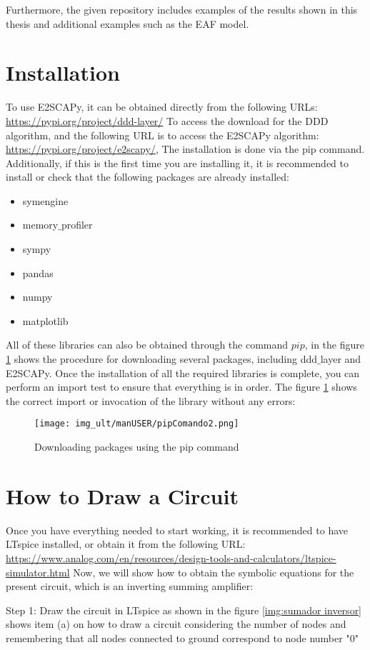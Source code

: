 \par
Furthermore, the given repository includes examples of the results shown in this thesis and additional examples such as the EAF model.
\section{Installation}
 To use E2SCAPy, it can be obtained directly from the following URLs: \url{https://pypi.org/project/ddd-layer/} To access the download for the DDD algorithm, and the following URL is to access the E2SCAPy algorithm: \url{https://pypi.org/project/e2scapy/}, The installation is done via the pip command. Additionally, if this is the first time you are installing it, it is recommended to install or check that the following packages are already installed:
\begin{itemize}
	\item symengine
	\item memory$\_$profiler
	\item sympy
	\item pandas
	\item numpy
	\item matplotlib
\end{itemize}

All of these libraries can also be obtained through the command $pip$, in the figure \ref{img:pip install} shows the procedure for downloading several packages, including ddd$\_$layer and E2SCAPy. Once the installation of all the required libraries is complete, you can perform an import test to ensure that everything is in order. The figure \ref{img:pip install} shows the correct import or invocation of the library without any errors:


\begin{figure}[H]
	\centering\texttt{[image: img\_ult/manUSER/pipComando2.png]}
	\caption{Downloading packages using the pip command}
	\label{img:pip install}
\end{figure} 

\section{How to Draw a Circuit}
Once you have everything needed to start working, it is recommended to have LTspice installed, or obtain it from the following URL: \url{https://www.analog.com/en/resources/design-tools-and-calculators/ltspice-simulator.html} Now, we will show how to obtain the symbolic equations for the present circuit, which is an inverting summing amplifier:\par 
Step 1: Draw the circuit in LTspice as shown in the figure
 \ref{img:sumador inversor} shows item (a) on how to draw a circuit considering the number of nodes and remembering that all nodes connected to ground correspond to node number "0"

